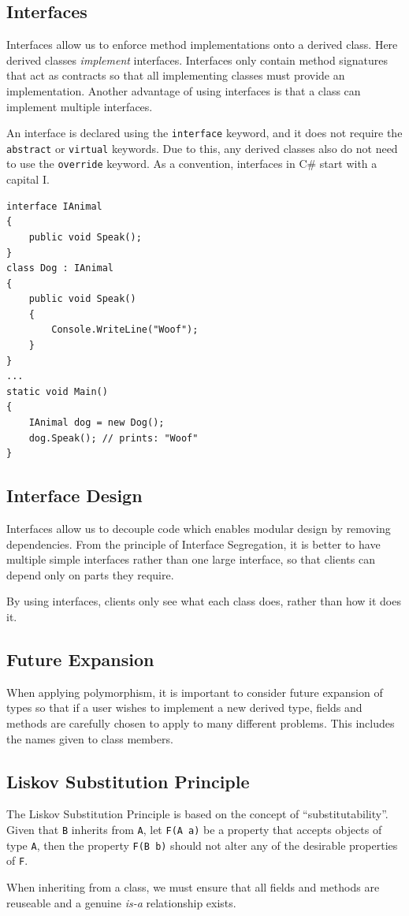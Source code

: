 \documentclass{article}
\begin{document}
\subsection{Interfaces}
Interfaces allow us to enforce method implementations onto a derived class. Here derived classes \textit{implement} interfaces.
Interfaces only contain method signatures that act as contracts so that all implementing classes must provide an implementation.
Another advantage of using interfaces is that a class can implement multiple interfaces.

An interface is declared using the \lstinline{interface} keyword, and it does not require the \lstinline{abstract} or \lstinline{virtual}
keywords. Due to this, any derived classes also do not need to use the \lstinline{override} keyword. As a convention, interfaces in
C\# start with a capital I.
\begin{lstlisting}
interface IAnimal
{
    public void Speak();
}
class Dog : IAnimal
{
    public void Speak() 
    {
        Console.WriteLine("Woof");
    }
}
...
static void Main()
{
    IAnimal dog = new Dog();
    dog.Speak(); // prints: "Woof"
}
\end{lstlisting}
\subsection{Interface Design}
Interfaces allow us to decouple code which enables modular design by removing dependencies.
From the principle of Interface Segregation, it is better to have multiple simple interfaces rather than one large 
interface, so that clients can depend only on parts they require. 

By using interfaces, clients only see what each class does, rather than how it does it.
\subsection{Future Expansion}
When applying polymorphism, it is important to consider future expansion of types so that if a user
wishes to implement a new derived type, fields and methods are carefully chosen to apply to 
many different problems. This includes the names given to class members.
\subsection{Liskov Substitution Principle}
The Liskov Substitution Principle is based on the concept of ``substitutability''. Given 
that \lstinline{B} inherits from \lstinline{A},
let \lstinline{F(A a)} be a property that accepts objects of type \lstinline{A}, then the property \lstinline{F(B b)} should not alter any of
the desirable properties of \lstinline{F}.

When inheriting from a class, we must ensure that all fields and methods are reuseable and a genuine \textit{is-a}
relationship exists.
\end{document}
